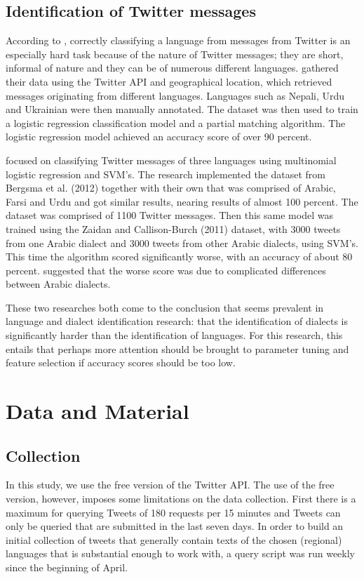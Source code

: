 \documentclass[
10pt, %
a4paper, %
oneside, %
headinclude,footinclude, %
] {book}%
\begin{document}
\section{Identification of Twitter messages}

According to \citep{bergsma}, correctly classifying a language from messages from Twitter is an especially hard task because of the nature of Twitter messages; they are short, informal of nature and they can be of numerous different languages. \citep{bergsma} gathered their data using the Twitter API and geographical location, which retrieved messages originating from different languages. Languages such as Nepali, Urdu and Ukrainian were then manually annotated. The dataset was then used to train a logistic regression classification model and a partial matching algorithm. The logistic regression model achieved an accuracy score of over 90 percent\citep{bergsma}.

\citep{Tratz} focused on classifying Twitter messages of three languages using multinomial logistic regression and SVM's. The research implemented the dataset from Bergsma et al. (2012) together with their own that was comprised of Arabic, Farsi and Urdu and got similar results, nearing results of almost 100 percent. The dataset was comprised of 1100 Twitter messages. Then this same model was trained using the Zaidan and Callison-Burch (2011) dataset, with 3000 tweets from one Arabic dialect and 3000 tweets from other Arabic dialects, using SVM's. This time the algorithm scored significantly worse, with an accuracy of about 80 percent. \citep{Tratz} suggested that the worse score was due to complicated differences between Arabic dialects.

These two researches both come to the conclusion that seems prevalent in language and dialect identification research: that the identification of dialects is significantly harder than the identification of languages. For this research, this entails that perhaps more attention should be brought to parameter tuning and feature selection if accuracy scores should be too low.

\chapter{Data and Material}

\section{Collection} 
In this study, we use the free version of the Twitter API. The use of the free version, however, imposes some limitations on the data collection. First there is a maximum for querying Tweets of 180 requests per 15 minutes and Tweets can only be queried that are submitted in the last seven days. In order to build an initial collection of tweets that generally contain texts of the chosen (regional) languages that is substantial enough to work with, a query script was run weekly since the beginning of April. \\
\end{document}
